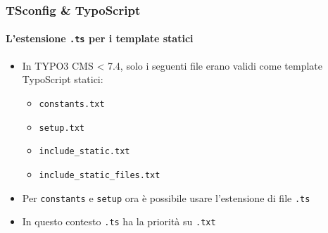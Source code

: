 
\begin{frame}[fragile]
	\frametitle{TSconfig \& TypoScript}
	\framesubtitle{L'estensione \texttt{.ts} per i template statici}

	\begin{itemize}

		\item In TYPO3 CMS < 7.4, solo i seguenti file erano validi come template TypoScript statici:

			\begin{itemize}
				\item \texttt{constants.txt}
				\item \texttt{setup.txt}
				\item \texttt{include\_static.txt}
				\item \texttt{include\_static\_files.txt}
			\end{itemize}

		\item Per \texttt{constants} e \texttt{setup} ora è possibile usare l'estensione di file \texttt{.ts}

		\item In questo contesto \texttt{.ts} ha la priorità su \texttt{.txt}

	\end{itemize}

\end{frame}


